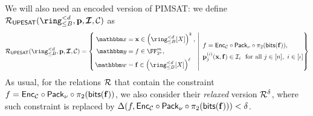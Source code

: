 \documentclass[11pt,letterpaper,usenames,dvipsnames]{article}
\begin{document}
We will also need an encoded version of PIMSAT:
we define    $\PIMSAT(\ringtwobounds{B}{\moduledegree},\pp,\bm{\ideal}, \cC)$ as 
$$
\PIMSAT(\ringtwobounds{B}{\moduledegree}, \pp,\bm{\ideal}, \cC) 
= \left\{\left. 
\begin{aligned}
    \inp &= \xx \in \left(\ringtwobounds{B}{\moduledegree}[X]\right)^{\inplen},\\
    \oracle &= f \in \comfield^{\codelength},\\
    \wit &=\bff \in \left(\ringtwobounds{B}{\moduledegree}[X]\right)^\codedim
\end{aligned} 
\ \right| \ 
\begin{aligned}
    & f = \Enc_{\cC}\circ \pack \circ \picomfield(\mathsf{bits}(\bff)),\\
    &\mathbf{p}_{j}^{(i)}(\xx, \bff) \in \ideal_i \ \text{ for all } j\in [\numrows], \ i \in [\iota]
\end{aligned}
\right\}
$$
%
%
As usual, for the relations $\mathcal{R}$ that contain the constraint $f=\mathsf{Enc}_{\mathcal{C}}\circ \mathsf{Pack}_\nu \circ \pi_2(\mathsf{bits}(\mathbf{f}))$, we also consider their \emph{relaxed} version $\mathcal{R}^\delta$, where such constraint is replaced by $\Delta(f,\mathsf{Enc}_{\mathcal{C}}\circ \mathsf{Pack}_\nu \circ \pi_2(\mathsf{bits}(\mathbf{f})))<\delta$.
\end{document}
